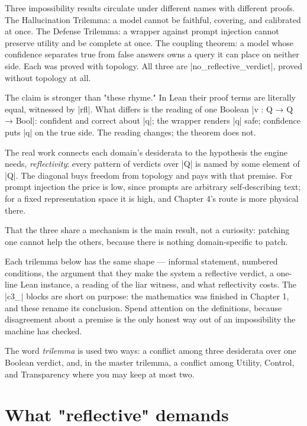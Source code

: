 \documentclass{memoir}
\begin{document}
Three impossibility results circulate under different names with different
proofs. The Hallucination Trilemma: a model cannot be faithful, covering, and
calibrated at once. The Defense Trilemma: a wrapper against prompt injection
cannot preserve utility and be complete at once. The coupling theorem: a model
whose confidence separates true from false answers owns a query it can place on
neither side. Each was proved with topology. All three are
\LeanVerb|no_reflective_verdict|, proved without topology at all.

The claim is stronger than "these rhyme." In Lean their proof terms are
literally equal, witnessed by \LeanVerb|rfl|. What differs is the reading of one Boolean
\LeanVerb|v : Q → Q → Bool|: confident and correct about \LeanVerb|q|; the wrapper renders \LeanVerb|q|
safe; confidence puts \LeanVerb|q| on the true side. The reading changes; the theorem
does not.

The real work connects each domain's desiderata to the hypothesis the engine
needs, \emph{reflectivity}: every pattern of verdicts over \LeanVerb|Q| is named by some
element of \LeanVerb|Q|. The diagonal buys freedom from topology and pays with that
premise. For prompt injection the price is low, since prompts are arbitrary
self-describing text; for a fixed representation space it is high, and Chapter
4's route is more physical there.

That the three share a mechanism is the main result, not a curiosity: patching
one cannot help the others, because there is nothing domain-specific to patch.

Each trilemma below has the same shape — informal statement, numbered
conditions, the argument that they make the system a reflective verdict, a
one-line Lean instance, a reading of the liar witness, and what reflectivity
costs. The \LeanVerb|c3_| blocks are short on purpose: the mathematics was finished in
Chapter 1, and these rename its conclusion. Spend attention on the definitions,
because disagreement about a premise is the only honest way out of an
impossibility the machine has checked.

The word \emph{trilemma} is used two ways: a conflict among three desiderata over one
Boolean verdict, and, in the master trilemma, a conflict among Utility, Control,
and Transparency where you may keep at most two.



\section{What "reflective" demands}\label{Two--Schemas--of--Impossibility-005F-005F-005F--Machine--Checked--Limits--of--Trustworthy--Machine--Learning-005F-005F-005F--and--Why--They--Tighten--with--Capability----Three--Trilemmata-005F-005F-005F--One--Theorem----What---005F-005F-005Freflective-005F-005F-005F--demands}
\end{document}
